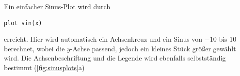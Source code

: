 \documentclass[DIV=14,headsepline,footsepline]{scrbook}
\begin{document}
				Ein einfacher Sinus-Plot wird durch
				\begin{lstlisting}
plot sin(x)
				\end{lstlisting}
				erreicht. Hier wird automatisch ein Achsenkreuz und ein Sinus von $-10$ bis 10 berechnet, wobei die $y$-Achse passend, jedoch ein kleines Stück größer gewählt wird. Die Achsenbeschriftung und die Legende wird ebenfalls selbstständig bestimmt (\autoref{fig:sinusplots}a)
				\begin{figure}[p]%
					\centering
					\\
					\\

\end{figure}
\end{document}
